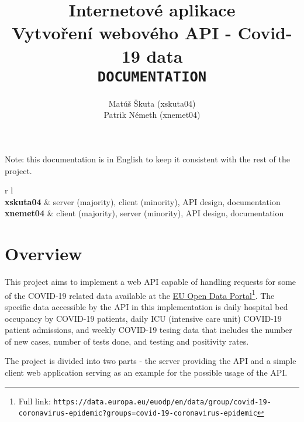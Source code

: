 \documentclass[pdftex, 11pt, a4paper]{article}
\newcommand{\code}{\texttt}
\begin{document}
    \title{Internetové aplikace \\
        Vytvoření webového API - Covid-19 data \\\vspace{0.5cm}
        \code{DOCUMENTATION}}
    \author{Matúš Škuta (xskuta04) \\ Patrik Németh (xnemet04)}
    \maketitle

    \begin{center}
        Note: this documentation is in English to keep it consistent with the rest of
        the project.

        \vspace{0.7cm}
        \begin{tabular}{ r l }
             \\
            \hline
            \textbf{xskuta04} & server (majority), client (minority), API design, documentation \\
            \textbf{xnemet04} & client (majority), server (minority), API design, documentation \\
        \end{tabular}
    \end{center}

    \section{Overview}
    This project aims to implement a web API capable of handling requests for some of
    the COVID-19 related data available at the
    \href{https://data.europa.eu/euodp/en/data/group/covid-19-coronavirus-epidemic?groups=covid-19-coronavirus-epidemic}
        {EU Open Data Portal}\footnote{Full link: \code{https://data.europa.eu/euodp/en/data/group/covid-19-coronavirus-epidemic?groups=\newline{}covid-19-coronavirus-epidemic}}.
    The specific data accessible by the API in this implementation is daily hospital bed
    occupancy by COVID-19 patients, daily ICU (intensive care unit) COVID-19 patient
    admissions, and weekly COVID-19 tesing data that includes the number of new cases,
    number of tests done, and testing and positivity rates.

    The project is divided into two parts - the server providing the API and a simple
    client web application serving as an example for the possible usage of the API.
\end{document}
